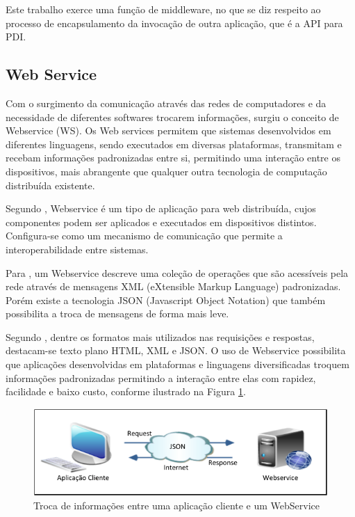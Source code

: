 \documentclass[12pt]{article}
\begin{document}
Este trabalho exerce uma função de middleware, no que se diz respeito ao processo de encapsulamento da invocação de outra aplicação, que é a API para PDI.

\subsection{Web Service}

Com o surgimento da comunicação através das redes de computadores e da necessidade
de diferentes softwares trocarem informações, surgiu o conceito de Webservice (WS).
Os Web services permitem que sistemas desenvolvidos em diferentes linguagens,
sendo executados em diversas plataformas, transmitam e recebam informações
padronizadas entre si, permitindo uma interação entre os dispositivos, mais abrangente
que qualquer outra tecnologia de computação distribuída existente.

Segundo \cite{kalin:09}, Webservice é um tipo de aplicação para web distribuída,
cujos componentes podem ser aplicados e executados em dispositivos distintos.
Configura-se como um mecanismo de comunicação que permite a interoperabilidade
entre sistemas. 

Para \cite{kreger:01}, um Webservice descreve uma coleção de operações
que são acessíveis pela rede através de mensagens XML (eXtensible Markup Language)
padronizadas. Porém existe a tecnologia JSON (Javascript Object Notation) que
também possibilita a troca de mensagens de forma mais leve. 

Segundo \cite{sandoval:09}, dentre os
formatos mais utilizados nas requisições e respostas, destacam-se texto plano
HTML, XML e JSON. O uso de Webservice
possibilita que aplicações desenvolvidas em plataformas e linguagens diversificadas
troquem informações padronizadas permitindo a interação entre elas com rapidez,
facilidade e baixo custo, conforme ilustrado na Figura \ref{fig:exampleFigura1}.

\begin{figure}[ht]
	\centering
	\includegraphics[width=.8\textwidth]{figura1.png}
	\caption{Troca de informações entre uma aplicação cliente e um WebService}
	\label{fig:exampleFigura1}
\end{figure}
\end{document}
